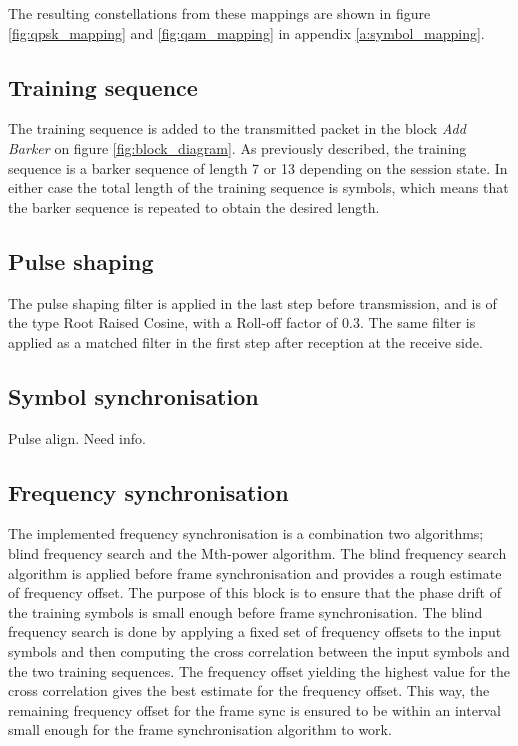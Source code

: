 The resulting constellations from these mappings are shown in figure \ref{fig:qpsk_mapping} and \ref{fig:qam_mapping} in appendix \ref{a:symbol_mapping}.

\subsection{Training sequence}
The training sequence is added to the transmitted packet in the block \textit{Add Barker} on figure \ref{fig:block_diagram}. As previously described, the training sequence is a barker sequence of length 7 or 13 depending on the session state. In either case the total length of the training sequence is \barkerSymbols symbols, which means that the barker sequence is repeated to obtain the desired length. 

\subsection{Pulse shaping}
The pulse shaping filter is applied in the last step before transmission, and is of the type Root Raised Cosine, with a Roll-off factor of 0.3. The same filter is applied as a matched filter in the first step after reception at the receive side. 

\subsection{Symbol synchronisation}
Pulse align. Need info.

\subsection{Frequency synchronisation}
The implemented frequency synchronisation is a combination two algorithms; blind frequency search and the Mth-power algorithm. The blind frequency search algorithm is applied before frame synchronisation and provides a rough estimate of frequency offset. The purpose of this block is to ensure that the phase drift of the training symbols is small enough before frame synchronisation. The blind frequency search is done by applying a fixed set of frequency offsets to the input symbols and then computing the cross correlation between the input symbols and the two training sequences. The frequency offset yielding the highest value for the cross correlation gives the best estimate for the frequency offset. This way, the remaining frequency offset for the frame sync is ensured to be within an interval small enough for the frame synchronisation algorithm to work. 

